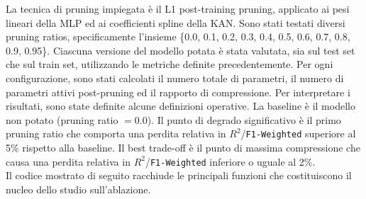 \documentclass[a4paper,12pt]{report}
\begin{document}
	La tecnica di pruning impiegata è il L1 post-training pruning, applicato ai pesi lineari della MLP ed ai coefficienti spline della KAN. Sono stati testati diversi pruning ratios, specificamente l'insieme \{0.0, 0.1, 0.2, 0.3, 0.4, 0.5, 0.6, 0.7, 0.8, 0.9, 0.95\}. Ciascuna versione del modello potata è stata valutata, sia sul test set che sul train set, utilizzando le metriche definite precedentemente. Per ogni configurazione, sono stati calcolati il numero totale di parametri, il numero di parametri attivi post-pruning ed il rapporto di compressione. Per interpretare i risultati, sono state definite alcune definizioni operative. La baseline è il modello non potato (pruning ratio $= 0.0$). Il punto di degrado significativo è il primo pruning ratio che comporta una perdita relativa in $R^2$/\texttt{F1-Weighted} superiore al 5\% rispetto alla baseline. Il best trade-off è il punto di massima compressione che causa una perdita relativa in $R^2$/\texttt{F1-Weighted} inferiore o uguale al 2\%. \\
	Il codice mostrato di seguito racchiude le principali funzioni che costituiscono il nucleo dello studio sull’ablazione.
\end{document}
